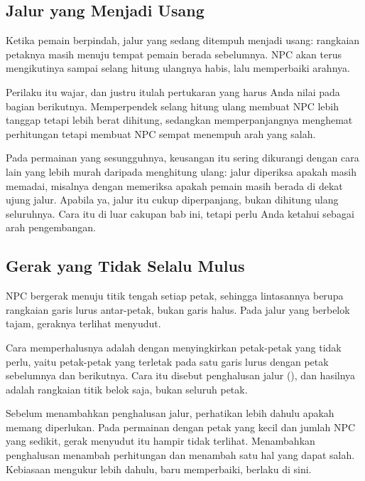 \subsection{Jalur yang Menjadi Usang}

Ketika pemain berpindah, jalur yang sedang ditempuh menjadi usang: rangkaian
petaknya masih menuju tempat pemain berada sebelumnya. NPC akan terus
mengikutinya sampai selang hitung ulangnya habis, lalu memperbaiki arahnya.

Perilaku itu wajar, dan justru itulah pertukaran yang harus Anda nilai pada
bagian berikutnya. Memperpendek selang hitung ulang membuat NPC lebih tanggap
tetapi lebih berat dihitung, sedangkan memperpanjangnya menghemat perhitungan
tetapi membuat NPC sempat menempuh arah yang salah.

\begin{catatabox}
Pada permainan yang sesungguhnya, keusangan itu sering dikurangi dengan cara
lain yang lebih murah daripada menghitung ulang: jalur diperiksa apakah masih
memadai, misalnya dengan memeriksa apakah pemain masih berada di dekat ujung
jalur. Apabila ya, jalur itu cukup diperpanjang, bukan dihitung ulang
seluruhnya. Cara itu di luar cakupan bab ini, tetapi perlu Anda ketahui sebagai
arah pengembangan.
\end{catatabox}

\subsection{Gerak yang Tidak Selalu Mulus}

NPC bergerak menuju titik tengah setiap petak, sehingga
lintasannya berupa rangkaian garis lurus antar-petak, bukan garis halus. Pada
jalur yang berbelok tajam, geraknya terlihat menyudut.

Cara memperhalusnya adalah dengan menyingkirkan petak-petak yang tidak perlu,
yaitu petak-petak yang terletak pada satu garis lurus dengan petak sebelumnya
dan berikutnya. Cara itu disebut penghalusan jalur (),
dan hasilnya adalah rangkaian titik belok saja, bukan seluruh petak.

\begin{tipsbox}
Sebelum menambahkan penghalusan jalur, perhatikan lebih dahulu apakah
memang diperlukan. Pada permainan dengan petak yang kecil dan jumlah NPC
yang sedikit, gerak menyudut itu hampir tidak terlihat. Menambahkan
penghalusan menambah perhitungan dan menambah satu hal yang dapat salah.
Kebiasaan mengukur lebih dahulu, baru memperbaiki, berlaku di sini.
\end{tipsbox}
